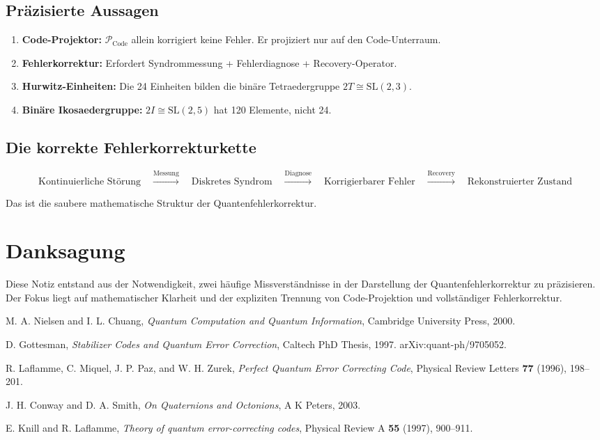 \documentclass[11pt,a4paper]{article}
\begin{document}
\subsection{Präzisierte Aussagen}

\begin{enumerate}
\item \textbf{Code-Projektor:} $\mathcal{P}_{\text{Code}}$ allein korrigiert keine Fehler. Er projiziert nur auf den Code-Unterraum.
\item \textbf{Fehlerkorrektur:} Erfordert Syndrommessung + Fehlerdiagnose + Recovery-Operator.
\item \textbf{Hurwitz-Einheiten:} Die 24 Einheiten bilden die binäre Tetraedergruppe $2T \cong \text{SL}(2,3)$.
\item \textbf{Binäre Ikosaedergruppe:} $2I \cong \text{SL}(2,5)$ hat 120 Elemente, nicht 24.
\end{enumerate}

\subsection{Die korrekte Fehlerkorrekturkette}

\begin{equation}
\boxed{
\text{Kontinuierliche Störung} \quad \xrightarrow{\text{Messung}} \quad \text{Diskretes Syndrom} \quad \xrightarrow{\text{Diagnose}} \quad \text{Korrigierbarer Fehler} \quad \xrightarrow{\text{Recovery}} \quad \text{Rekonstruierter Zustand}
}
\end{equation}

Das ist die saubere mathematische Struktur der Quantenfehlerkorrektur.

\section*{Danksagung}

Diese Notiz entstand aus der Notwendigkeit, zwei häufige Missverständnisse in der Darstellung der Quantenfehlerkorrektur zu präzisieren. Der Fokus liegt auf mathematischer Klarheit und der expliziten Trennung von Code-Projektion und vollständiger Fehlerkorrektur.

\begin{thebibliography}{99}

M. A. Nielsen and I. L. Chuang, \textit{Quantum Computation and Quantum Information}, Cambridge University Press, 2000.

D. Gottesman, \textit{Stabilizer Codes and Quantum Error Correction}, Caltech PhD Thesis, 1997. arXiv:quant-ph/9705052.

R. Laflamme, C. Miquel, J. P. Paz, and W. H. Zurek, \textit{Perfect Quantum Error Correcting Code}, Physical Review Letters \textbf{77} (1996), 198--201.

J. H. Conway and D. A. Smith, \textit{On Quaternions and Octonions}, A K Peters, 2003.

E. Knill and R. Laflamme, \textit{Theory of quantum error-correcting codes}, Physical Review A \textbf{55} (1997), 900--911.

\end{thebibliography}
\end{document}

